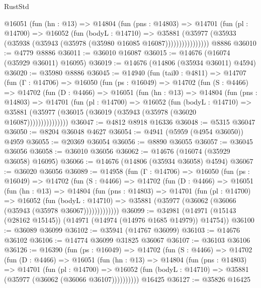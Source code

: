 \begin{lexlean}{RustStd}
\begin{coremodule}
              @16051
                (fun (hn : @13) =>
                @14804
                  (fun (pns : @14803) =>
                  @14701
                    (fun (pl : @14700) =>
                    @16052
                      (fun (bodyL : @14710) =>
                      @35881
                        (@35977
                          (@35933 (@35938 (@35943 (@35978 (@35980 @16085 @16087))))))))))))))))
    @8886
@36010 := @4779 @8886
@36011 := @36010 @16087
@36015 := @14676 (@16074 (@35929 @36011) @16095)
@36019 := @14676 (@14806 (@35934 @36011) @4594)
@36020 := @35980 @8886
@36045 := @14940
    (fun (tail0 : @4811) =>
    @14707
      (fun (Γ : @14706) =>
      @16050
        (fun (ps : @16049) =>
        @14702
          (fun (S : @4466) =>
          @14702
            (fun (D : @4466) =>
            @16051
              (fun (hn : @13) =>
              @14804
                (fun (pns : @14803) =>
                @14701
                  (fun (pl : @14700) =>
                  @16052
                    (fun (bodyL : @14710) =>
                    @35881 (@35977 (@36015 (@36019 (@35943 (@35978 (@36020 @16087)))))))))))))))
@36047 := @4812 @8918 @16336
@36048 := @5315 @36047
@36050 := @8204 @36048 @4627
@36054 := @4941 (@5959 (@4954 @36050)) @4959
@36055 := @20369 @36054
@36056 := @8890 @36055
@36057 := @36045 @36056
@36058 := @36010 @36056
@36062 := @14676 (@16074 (@35929 @36058) @16095)
@36066 := @14676 (@14806 (@35934 @36058) @4594)
@36067 := @36020 @36056
@36089 := @14958
    (fun (Γ : @14706) =>
    @16050
      (fun (ps : @16049) =>
      @14702
        (fun (S : @4466) =>
        @14702
          (fun (D : @4466) =>
          @16051
            (fun (hn : @13) =>
            @14804
              (fun (pns : @14803) =>
              @14701
                (fun (pl : @14700) =>
                @16052
                  (fun (bodyL : @14710) =>
                  @35881 (@35977 (@36062 (@36066 (@35943 (@35978 @36067)))))))))))))
@36099 := @34981 (@14971 (@15143 (@28162 @15145)) (@14971 (@14974 (@14976 @1685 @14979)) @14754))
@36100 := @36089 @36099
@36102 := @35941 (@14767 @36099)
@36103 := @14676 @36102
@36106 := @14774 @36099 @31825 @36067
@36107 := @36103 @36106
@36126 := @16390
    (fun (ps : @16049) =>
    @14702
      (fun (S : @4466) =>
      @14702
        (fun (D : @4466) =>
        @16051
          (fun (hn : @13) =>
          @14804
            (fun (pns : @14803) =>
            @14701
              (fun (pl : @14700) =>
              @16052 (fun (bodyL : @14710) => @35881 (@35977 (@36062 (@36066 @36107))))))))))
    @16425
@36127 := @35826 @16425

\end{coremodule}
\end{lexlean}
